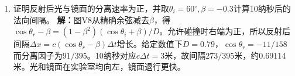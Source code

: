\documentclass[UTF8,fontset=fandol,a4paper,11pt]{ctexart}
\begin{document}
\begin{enumerate}
\item 证明反射后光与镜面的分离速率为正，并取$\theta_i=60^\circ,\beta=-0.3$计算10纳秒后的法向间隔。
\textbf{解：}图V8从精确余弦减去$\beta$，得$\cos\theta_r-\beta=(1-\beta^2)(\cos\theta_i+\beta)/D$。允许碰撞时右端为正，所以反射后间隔$\Delta x=c(\cos\theta_r-\beta)\Delta t$增长。给定数值下$D=0.79$，$\cos\theta_r=-11/158$而分离因子为$91/395$。10纳秒对应$c\Delta t=3$米，故间隔$273/395$米，约0.69114米。光和镜面在实验室均向左，镜面退行更快。
\begin{center}\begin{minipage}{.98\linewidth}\centering
{}
\end{minipage}
\end{center}
\end{enumerate}
\end{document}
